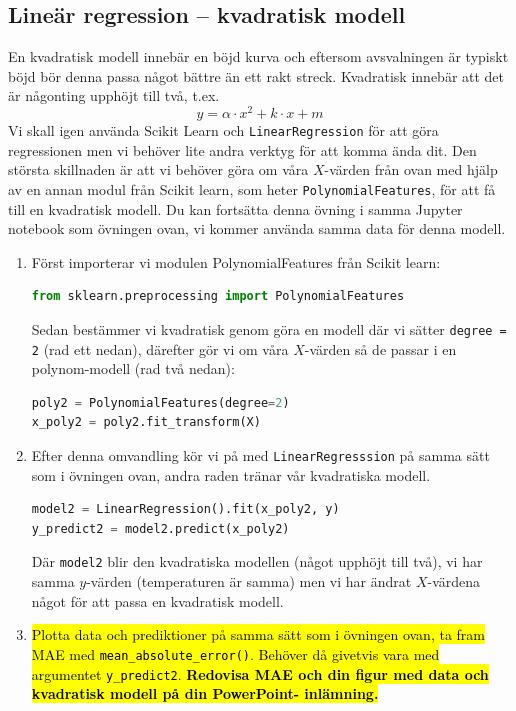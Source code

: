 \documentclass{article}
\begin{document}
\subsection{Lineär regression -- kvadratisk modell}
En kvadratisk modell innebär en böjd kurva och eftersom avsvalningen är typiskt böjd bör denna passa något bättre än ett rakt streck. Kvadratisk innebär att det är någonting upphöjt till två, t.ex.
\[ y = \alpha \cdot x^2 + k \cdot x + m \]
Vi skall igen använda Scikit Learn och \texttt{LinearRegression} för att göra regressionen men vi behöver lite andra verktyg för att komma ända dit. Den största skillnaden är att vi behöver göra om våra $X$-värden från ovan med hjälp av en annan modul från Scikit learn, som heter \texttt{PolynomialFeatures}, för att få till en kvadratisk modell.
Du kan fortsätta denna övning i samma Jupyter notebook som övningen ovan, vi kommer använda samma data för denna modell.
\begin{enumerate}
    \item Först importerar vi modulen PolynomialFeatures från Scikit learn:
    \begin{lstlisting}[language=Python]
from sklearn.preprocessing import PolynomialFeatures
\end{lstlisting}
    Sedan bestämmer vi kvadratisk genom göra en modell där vi sätter \texttt{degree = 2} (rad ett nedan), därefter gör vi om våra $X$-värden så de passar i en polynom-modell (rad två nedan):
    \begin{lstlisting}[language=Python]
poly2 = PolynomialFeatures(degree=2)
x_poly2 = poly2.fit_transform(X)
\end{lstlisting}
    \item Efter denna omvandling kör vi på med \texttt{LinearRegresssion} på samma sätt som i övningen ovan, andra raden tränar vår kvadratiska modell.
    \begin{lstlisting}[language=Python]
model2 = LinearRegression().fit(x_poly2, y)
y_predict2 = model2.predict(x_poly2)
\end{lstlisting}
    Där \texttt{model2} blir den kvadratiska modellen (något upphöjt till två), vi har samma $y$-värden (temperaturen är samma) men vi har ändrat $X$-värdena något för att passa en kvadratisk modell.
    \item \hl{Plotta data och prediktioner på samma sätt som i övningen ovan, ta fram MAE med \texttt{mean\_absolute\_error()}. Behöver då givetvis vara med argumentet \texttt{y\_predict2}. \textbf{Redovisa MAE och din figur med data och kvadratisk modell på din PowerPoint- inlämning.}}
\end{enumerate}
\end{document}
